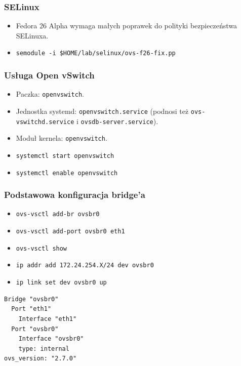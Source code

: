 \documentclass[dvipsnames,table]{beamer}
\begin{document}
\begin{frame}
\frametitle{SELinux}
\begin{itemize}
	\item Fedora 26 Alpha wymaga małych poprawek do polityki bezpieczeństwa SELinuxa.
	\item {\tt semodule -i \$HOME/lab/selinux/ovs-f26-fix.pp}
\end{itemize}	
\end{frame}

\begin{frame}
\frametitle{Usługa Open vSwitch}
\begin{itemize}
	\item Paczka: {\tt openvswitch}.
	\item Jednostka systemd: {\tt openvswitch.service} (podnosi też {\tt ovs-vswitchd.service} i {\tt ovsdb-server.service}).
	\item Moduł kernela: {\tt openvswitch}.
	\item {\tt systemctl start openvswitch}
	\item {\tt systemctl enable openvswitch}

\end{itemize}
\end{frame}

\begin{frame}[fragile]
\frametitle{Podstawowa konfiguracja bridge'a}
\begin{itemize}
	\item {\tt ovs-vsctl add-br ovsbr0}
	\item {\tt ovs-vsctl add-port ovsbr0 eth1}
	\item {\tt ovs-vsctl show}
	\item {\tt ip addr add 172.24.254.X/24 dev ovsbr0}
	\item {\tt ip link set dev ovsbr0 up}
\end{itemize}
\scriptsize
\begin{verbatim}
Bridge "ovsbr0"
  Port "eth1"
    Interface "eth1"
  Port "ovsbr0"
    Interface "ovsbr0"
    type: internal
ovs_version: "2.7.0"
\end{verbatim}
\end{frame}
\end{document}
